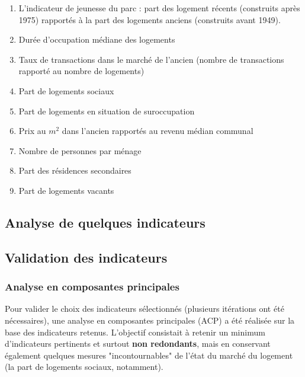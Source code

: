 \documentclass[12pt, a4paper]{article}
\begin{document}
\begin{enumerate}
\item L'indicateur de jeunesse du parc : part des logement récents (construits après 1975) rapportés à la part des logements anciens (construits avant 1949). 
\item Durée d'occupation médiane des logements
\item Taux de transactions dans le marché de l'ancien (nombre de transactions rapporté au nombre de logements)
\item Part de logements sociaux
\item Part de logements en situation de suroccupation
\item Prix au $m^2$ dans l'ancien rapportés au revenu médian communal
\item Nombre de personnes par ménage
\item Part des résidences secondaires
\item Part de logements vacants
\end{enumerate}


\subsection{Analyse de quelques indicateurs}

\subsection{Validation des indicateurs}

\subsubsection{Analyse en composantes principales}

Pour valider le choix des indicateurs sélectionnés (plusieurs itérations ont été nécessaires), une analyse en composantes principales (ACP) a été réalisée sur la base des indicateurs retenus. L'objectif consistait à retenir un minimum d'indicateurs pertinents et surtout \textbf{non redondants}, mais en conservant également quelques mesures "incontournables" de l'état du marché du logement (la part de logements sociaux, notamment).
\end{document}
